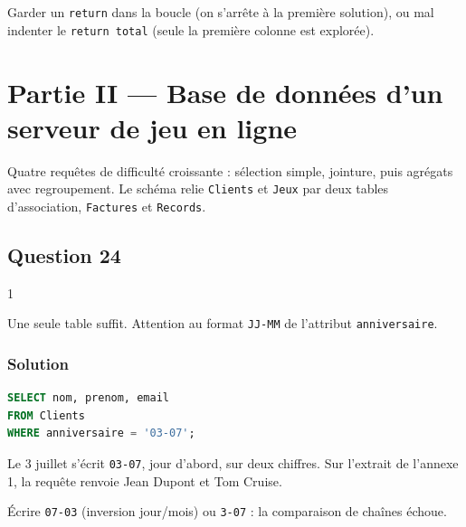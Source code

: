\documentclass[11pt,a4paper]{article}
\begin{document}
\begin{piege}

Garder un \texttt{return} dans la boucle (on s'arrête à la première solution), ou mal indenter le \texttt{return\ total} (seule la première colonne est explorée).

\end{piege}

\hypertarget{partie-ii-base-de-donnuxe9es-dun-serveur-de-jeu-en-ligne}{%
\section{Partie II --- Base de données d'un serveur de jeu en ligne}\label{partie-ii-base-de-donnuxe9es-dun-serveur-de-jeu-en-ligne}}

Quatre requêtes de difficulté croissante : sélection simple, jointure, puis agrégats avec regroupement. Le schéma relie \texttt{Clients} et \texttt{Jeux} par deux tables d'association, \texttt{Factures} et \texttt{Records}.

\hypertarget{question-24}{%
\subsection{Question 24}\label{question-24}}

\begin{indication}{1}

Une seule table suffit. Attention au format \texttt{\textquotesingle{}JJ-MM\textquotesingle{}} de l'attribut \texttt{anniversaire}.

\end{indication}

\hypertarget{solution-23}{%
\subsubsection{Solution}\label{solution-23}}

\begin{lstlisting}[language=SQL]
SELECT nom, prenom, email
FROM Clients
WHERE anniversaire = '03-07';
\end{lstlisting}

Le 3 juillet s'écrit \texttt{\textquotesingle{}03-07\textquotesingle{}}, jour d'abord, sur deux chiffres. Sur l'extrait de l'annexe 1, la requête renvoie Jean Dupont et Tom Cruise.

\begin{piege}

Écrire \texttt{\textquotesingle{}07-03\textquotesingle{}} (inversion jour/mois) ou \texttt{\textquotesingle{}3-07\textquotesingle{}} : la comparaison de chaînes échoue.

\end{piege}
\end{document}
